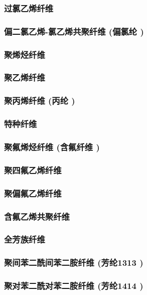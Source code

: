 \documentclass[UTF8]{../../ApplicationUniverse}
\begin{document}
        \subsubsection{过氯乙烯纤维}
        \subsubsection{偏二氯乙烯-氯乙烯共聚纤维 (偏氯纶 )}
    \subsubsection{聚烯烃纤维}
        \subsubsection{聚乙烯纤维}
        \subsubsection{聚丙烯纤维 (丙纶 )}
    \subsubsection{特种纤维}
        \subsubsection{聚氟烯烃纤维 (含氟纤维 )}
            \subsubsection{聚四氟乙烯纤维}
            \subsubsection{聚偏氟乙烯纤维}
            \subsubsection{含氟乙烯共聚纤维}
        \subsubsection{全芳族纤维}
            \subsubsection{聚间苯二酰间苯二胺纤维 (芳纶1313 )}
            \subsubsection{聚对苯二酰对苯二胺纤维 (芳纶1414 )}
\end{document}
